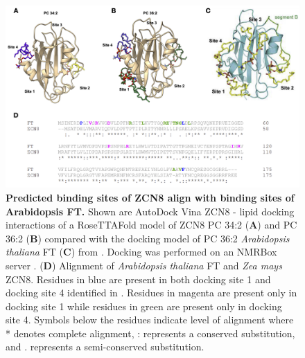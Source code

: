 \documentclass[9pt,twocolumn,twoside,lineno]{biorxiv}
\begin{document}
\clearpage

\begin{figure}[t]
\begin{center}
\includegraphics[width=0.8 \paperwidth]{Sup_Figures/Sup_Fig_12.png}
\caption{\textbf{Predicted binding sites of ZCN8 align with binding sites of Arabidopsis FT.} Shown are AutoDock Vina \cite{Trott2010-su} ZCN8 - lipid docking interactions of a RoseTTAFold \cite{baek2021sci} model of ZCN8 PC 34:2 (\textbf{A}) and PC 36:2 (\textbf{B}) compared with the docking model of PC 36:2 \textit{Arabidopsis thaliana} FT (\textbf{C}) from \cite{Nakamura2019-ht}. 
Docking was performed on an NMRBox server \cite{maciejewski2010bj}.
(\textbf{D}) Alignment of \textit{Arabidopsis thaliana} FT and \textit{Zea mays} ZCN8. 
Residues in blue are present in both docking site 1 and docking site 4 identified in \cite{Nakamura2019-ht}. 
Residues in magenta are present only in docking site 1 while residues in green are present only in docking site 4. 
Symbols below the residues indicate level of alignment where * denotes complete alignment, : represents a conserved substitution, and . represents a semi-conserved substitution.}
\label{figure:Sup:Docking}
\end{center}
\end{figure} 
\end{document}
